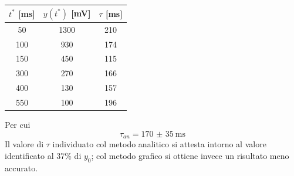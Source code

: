 \documentclass[a4paper, 12pt, twoside]{report}
\newcommand{\ra}[1]{\renewcommand{\arraystretch}{#1}} %
\begin{document}
		\begin{table}[H]
			\centering
			\ra{1.3}
			\begin{tabular}{ccc}
				\toprule
				$t^*$ [\si{\milli\second}] & $y(t^*)$ [\si{\milli\volt}] & $\tau$ [\si{\milli\second}] \\ \midrule
				50                                                     & 1300                                                       & 210                                                      \\
				100                                                   & 930                                                       & 174                                                      \\
				150                                                     & 450                                                       & 115                                                      \\
				300                                                     & 270                                                        & 166                                                      \\
				400                                                     & 130                                                        & 157                                                      \\
				550                                                     & 100                                                        & 196                                                      \\ \bottomrule
			\end{tabular}
		\end{table}		
		Per cui
		\[\tau_{an} = \SI[separate-uncertainty = true]{170(35)}{\milli\second} \]			
		Il valore di $\tau$ individuato col metodo analitico si attesta intorno al valore identificato al 37\% di $y_0$; col metodo grafico si ottiene invece un risultato meno accurato.
							
\newpage	
\end{document}
